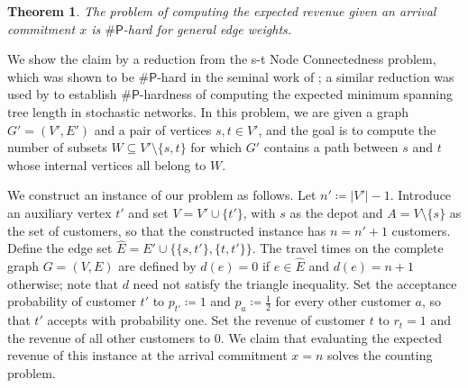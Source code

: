\documentclass[11pt]{article}
\theoremstyle{plain}
\newtheorem{theorem}{Theorem}
\theoremstyle{definition}
\renewenvironment{proof}[1]{\par\noindent{\itshape #1}\space\ignorespaces}{\par\medskip}
\begin{document}
	\begin{theorem} \label{thm:complexity}
		The problem of computing the expected revenue given an arrival commitment $x$ is $\textsf{\#P}$-hard for general edge weights.
	\end{theorem}

	\begin{proof}{Proof.}
	We show the claim by a reduction from the {\sc s-t Node Connectedness} problem, which was shown to be $\textsf{\#P}$-hard in the seminal work of \cite{valiant1979complexity}; a similar reduction was used by \citet{kamousi2011stochastic} to establish $\textsf{\#P}$-hardness of computing the expected minimum spanning tree length in stochastic networks. In this problem, we are given a graph $G'=(V',E')$ and a pair of vertices $s, t \in V'$, and the goal is to compute the number of subsets $W \subseteq V' \setminus \{s,t\}$ for which $G'$ contains a path between $s$ and $t$ whose internal vertices all belong to $W$.

	We construct an instance of our problem as follows. Let $n' \coloneqq |V'| - 1$. Introduce an auxiliary vertex $t'$ and set $V = V' \cup \{t'\}$, with $s$ as the depot and $A = V \setminus \{s\}$ as the set of customers, so that the constructed instance has $n = n' + 1$ customers. Define the edge set $\hat{E} = E' \cup \{\{s,t'\}, \{t,t'\}\}$. The travel times on the complete graph $G = (V, E)$ are defined by $d(e) = 0$ if $e \in \hat{E}$ and $d(e) = n+1$ otherwise; note that $d$ need not satisfy the triangle inequality. Set the acceptance probability of customer $t'$ to $p_{t'} \coloneqq 1$ and $p_a \coloneqq \frac{1}{2}$ for every other customer $a$, so that $t'$ accepts with probability one. Set the revenue of customer $t$ to $r_t = 1$ and the revenue of all other customers to $0$. We claim that evaluating the expected revenue of this instance at the arrival commitment $x = n$ solves the counting problem.


\end{proof}
\end{document}
